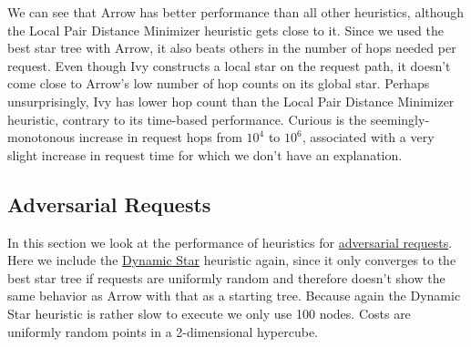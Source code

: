 \documentclass[a4paper, oneside]{discothesis}
\begin{document}

We can see that Arrow has better performance than all other heuristics, although the Local Pair Distance Minimizer heuristic gets close to it. Since we used the best star tree with Arrow, it also beats others in the number of hops needed per request. Even though Ivy constructs a local star on the request path, it doesn't come close to Arrow's low number of hop counts on its global star. Perhaps unsurprisingly, Ivy has lower hop count than the Local Pair Distance Minimizer heuristic, contrary to its time-based performance. Curious is the seemingly-monotonous increase in request hops from $10^4$ to $10^6$, associated with a very slight increase in request time for which we don't have an explanation.

\subsection{Adversarial Requests}\label{result:adversary}

In this section we look at the performance of heuristics for \hyperref[req:adversary]{adversarial requests}. Here we include the \hyperref[alg:dynstar]{Dynamic Star} heuristic again, since it only converges to the best star tree if requests are uniformly random and therefore doesn't show the same behavior as Arrow with that as a starting tree. Because again the Dynamic Star heuristic is rather slow to execute we only use 100 nodes. Costs are uniformly random points in a 2-dimensional hypercube.
\end{document}
